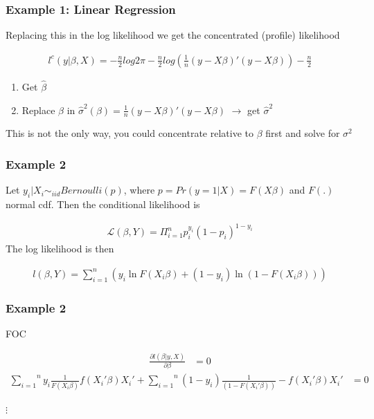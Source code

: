 \documentclass[
  shownotes,
  xcolor={svgnames},
  hyperref={colorlinks,citecolor=DarkBlue,linkcolor=DarkRed,urlcolor=DarkBlue}
  , aspectratio=169]{beamer}
\begin{document}
\begin{frame}[fragile]
\frametitle{Example 1: Linear Regression}

Replacing this in the log likelihood we get the concentrated (profile) likelihood

\begin{align}
l^c(y|\beta,X) = -\frac{n}{2}log 2 \pi-\frac{n}{2}log\left( \frac{1}{n}(y-X\beta)'(y-X\beta)\right)-\frac{n}{2}
\end{align}

\medskip

\begin{enumerate}
 \item Get $\hat \beta$
 \item Replace $\beta$ in $\hat \sigma^2(\beta) = \frac{1}{n}(y-X\beta)'(y-X\beta)$ $\rightarrow$ get $\hat \sigma^2$
\end{enumerate}

\medskip

This is not the only way, you could concentrate relative to $\beta$ first and solve for $\sigma^2$

\end{frame}
\begin{frame}[fragile]
\frametitle{Example 2}

Let $y_i|X_i \sim_{iid} Bernoulli(p)$, where $p=Pr(y=1|X)=F(X\beta)$ and $F(.)$ normal cdf. Then the conditional likelihood is

\begin{align}
\mathcal{L}(\beta,Y)=\Pi_{i=1}^n p_i^{y_i}(1-p_i)^{1-y_i}
\end{align}
The log likelihood is then

\begin{align}
l(\beta,Y)=\sum_{i=1}^n\left(y_i \ln F(X_i\beta)+(1-y_i)\ln(1-F(X_i\beta))\right)
\end{align}

\end{frame}
\begin{frame}[fragile]
\frametitle{Example 2}
FOC

\begin{align}
\frac{\partial l(\beta|y,X)}{\partial\beta}&=0 
\end{align}
\begin{align}
\overset{n}{\underset{i=1}{\sum}}y_{i}\frac{1}{F(X_{i}\beta)}f(X_{i}'\beta)X_{i}'+\overset{n}{\underset{i=1}{\sum}}\left(1-y_{i}\right)\frac{1}{\left(1-F(X_{i}'\beta)\right)}-f(X_{i}'\beta)X_{i}'&=0
\end{align}

\begin{centering}
$\vdots$
\end{centering}

\end{frame}
\end{document}
